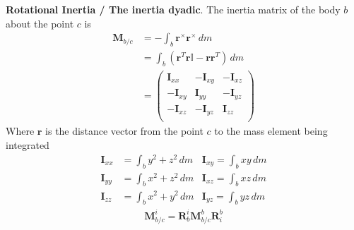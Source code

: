 \textbf{Rotational Inertia / The inertia dyadic}. The inertia matrix of the body \(b\) about the point \(c\) is
\begin{align*}
    \bm{M}_{b/c} &= - \int_b \bm{r}^\times\bm{r}^\times\,dm \\
    &= \int_b (\bm{r}^T\bm{r}\mathbb{I} - \bm{r}\bm{r}^T)\,dm\\
    &= \begin{pmatrix}
        \bm{I}_{xx} & -\bm{I}_{xy} & -\bm{I}_{xz} \\
        -\bm{I}_{xy} & \bm{I}_{yy} & -\bm{I}_{yz} \\
        -\bm{I}_{xz} & -\bm{I}_{yz} & \bm{I}_{zz} \\
    \end{pmatrix}
\end{align*}
Where \(\bm{r}\) is the distance vector from the point \(c\) to the mass element being integrated
\begin{align*}
    \bm{I}_{xx} &= \int_b y^2 + z^2  \,dm & \bm{I}_{xy} = \int_b xy \,dm \\
    \bm{I}_{yy} &= \int_b x^2 + z^2  \,dm & \bm{I}_{xz} = \int_b xz \,dm\\
    \bm{I}_{zz} &= \int_b x^2 + y^2  \,dm & \bm{I}_{yz} = \int_b yz \,dm
\end{align*}
\begin{align*}
    \bm{M}_{b/c}^i = \bm{R}_b^i\bm{M}_{b/c}^b\bm{R}_i^b
\end{align*}

